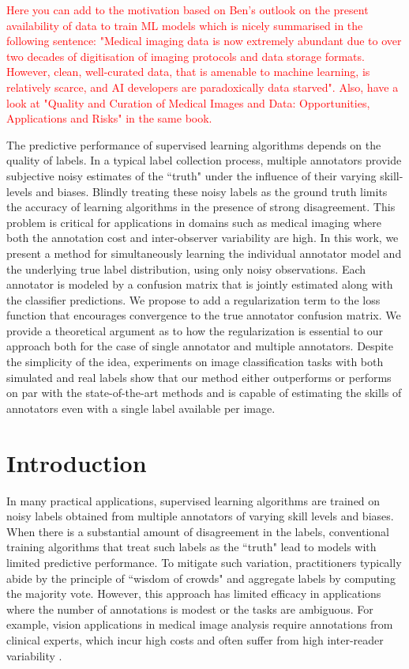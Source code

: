 \textcolor{red}{Here you can add to the motivation based on Ben's outlook on the present availability of data to train ML models \cite{harvey2019standardised} which is nicely summarised in the following sentence: "Medical imaging data is now extremely abundant due to over two decades of digitisation of imaging protocols and data storage formats. However, clean, well-curated data, that is amenable to machine learning, is relatively scarce, and AI developers are paradoxically data starved". Also, have a look at "Quality and Curation of Medical Images and Data: Opportunities, Applications and Risks" \cite{van2019quality} in the same book. }



The predictive performance of supervised learning algorithms depends on the quality of labels. In a typical label collection process, multiple annotators provide subjective noisy estimates of the ``truth" under the influence of their varying skill-levels and biases. Blindly treating these noisy labels as the ground truth limits the accuracy of learning algorithms in the presence of strong disagreement. This problem is critical for applications in domains such as medical imaging where both the annotation cost and inter-observer variability are high. In this work, we present a method for simultaneously learning the individual annotator model and the underlying true label distribution, using only noisy observations. Each annotator is modeled by a confusion matrix that is jointly estimated along with the classifier predictions. We propose to add a regularization term to the loss function that encourages convergence to the true annotator confusion matrix. We provide a theoretical argument as to how the regularization is essential to our approach both for the case of single annotator and multiple annotators. Despite the simplicity of the idea, experiments on image classification tasks with both simulated and real labels show that our method either outperforms or performs on par with the state-of-the-art methods and is capable of estimating the skills of annotators even with a single label available per image.  
 

\section{Introduction}
In many practical applications, supervised learning algorithms are trained on noisy labels obtained from multiple annotators of varying skill levels and biases. When there is a substantial amount of disagreement in the labels, conventional training algorithms that treat such labels as the ``truth" lead to models with limited predictive performance. To mitigate such variation, practitioners typically abide by the principle of ``wisdom of crowds" \cite{surowiecki2005wisdom} and aggregate labels by computing the majority vote. However, this approach has limited efficacy in applications where the number of annotations is modest or the tasks are ambiguous. For example,  vision applications in medical image analysis \cite{litjens2017survey} require annotations from clinical experts, which incur high costs and often suffer from high inter-reader variability \cite{watadani2013interobserver,rosenkrantz2013comparison,lazarus2006bi,warfield2004simultaneous}. 


